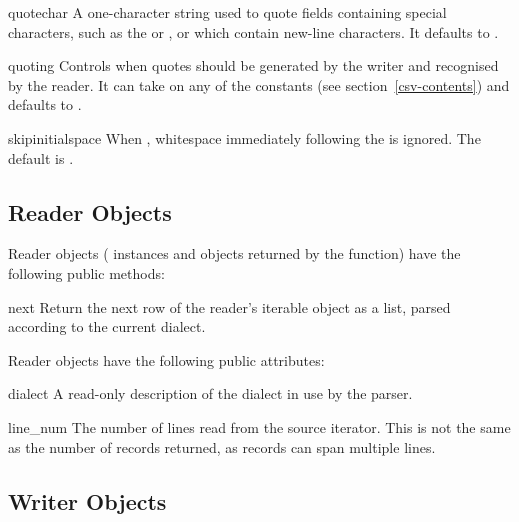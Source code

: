 \begin{memberdesc}[Dialect]{quotechar}
A one-character string used to quote fields containing special characters,
such as the  or , or which contain new-line
characters.  It defaults to .
\end{memberdesc}

\begin{memberdesc}[Dialect]{quoting}
Controls when quotes should be generated by the writer and recognised
by the reader.  It can take on any of the  constants
(see section~\ref{csv-contents}) and defaults to .
\end{memberdesc}

\begin{memberdesc}[Dialect]{skipinitialspace}
When , whitespace immediately following the 
is ignored.  The default is .
\end{memberdesc}


\subsection{Reader Objects}

Reader objects ( instances and objects returned by
the  function) have the following public methods:

\begin{methoddesc}{next}{}
Return the next row of the reader's iterable object as a list, parsed
according to the current dialect.
\end{methoddesc}

Reader objects have the following public attributes:

\begin{memberdesc}{dialect}
A read-only description of the dialect in use by the parser.
\end{memberdesc}

\begin{memberdesc}{line_num}
 The number of lines read from the source iterator. This is not the same
 as the number of records returned, as records can span multiple lines.
\end{memberdesc}


\subsection{Writer Objects}

